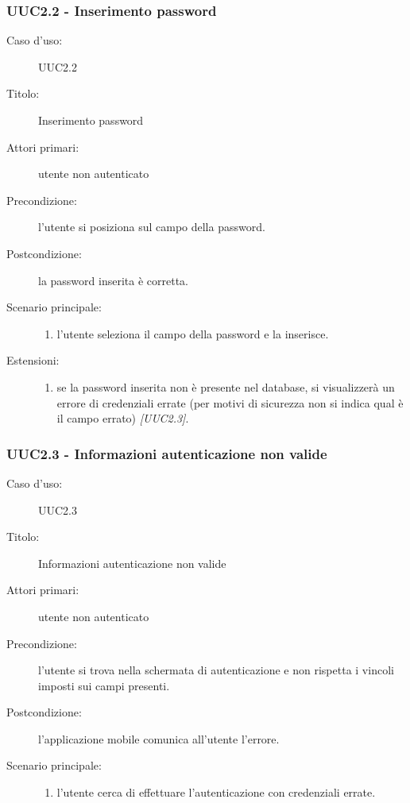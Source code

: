 \documentclass[../analisi-dei-requisiti.tex]{subfiles}
\begin{document}
\subsubsection{UUC2.2 - Inserimento password}%
\label{subsub:UUC2.2utente}
\begin{description}
  \item[Caso d’uso:] UUC2.2
  \item[Titolo:] Inserimento password
  \item[Attori primari:] utente non autenticato
  \item[Precondizione:] l'utente si posiziona sul campo della password.
  \item[Postcondizione:] la password inserita è corretta.
  \item[Scenario principale:]
  \begin{enumerate}
    \item l'utente seleziona il campo della password e la inserisce.
  \end{enumerate}
  \item[Estensioni:]
  \begin{enumerate}
    \item se la password inserita non è presente nel database, si visualizzerà un errore di credenziali errate (per motivi di sicurezza non si indica qual è il campo errato) \emph{[UUC2.3]}.
  \end{enumerate}
\end{description}

\subsubsection{UUC2.3 - Informazioni autenticazione non valide}%
\label{subsub:UUC2.3utente}
\begin{description}
  \item[Caso d’uso:] UUC2.3
  \item[Titolo:] Informazioni autenticazione non valide
  \item[Attori primari:] utente non autenticato
  \item[Precondizione:] l'utente si trova nella schermata di autenticazione e non rispetta i vincoli imposti sui campi presenti.
  \item[Postcondizione:] l'applicazione mobile comunica all'utente l'errore.
  \item[Scenario principale:]
        \begin{enumerate}
          \item l'utente cerca di effettuare l'autenticazione con credenziali errate.
        \end{enumerate}
\end{description}
\end{document}

